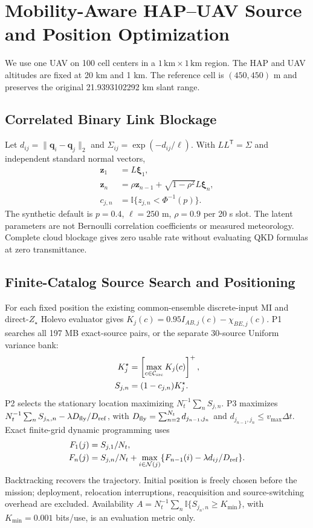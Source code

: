 \section{Mobility-Aware HAP--UAV Source and Position Optimization}
We use one UAV on 100 cell centers in a $1\,\mathrm{km}\times1\,\mathrm{km}$ region.
The HAP and UAV altitudes are fixed at 20 km and 1 km. The reference cell is
$(450,450)$ m and preserves the original 21.9393102292 km slant range.
\subsection{Correlated Binary Link Blockage}
Let $d_{ij}=\|\mathbf q_i-\mathbf q_j\|_2$ and $\Sigma_{ij}=\exp(-d_{ij}/\ell)$.
With $LL^{\mathsf T}=\Sigma$ and independent standard normal vectors,
\begin{align}
\mathbf z_1&=L\boldsymbol\xi_1,\\
\mathbf z_n&=\rho\mathbf z_{n-1}+\sqrt{1-\rho^2}L\boldsymbol\xi_n,\\
c_{j,n}&=\mathbb{I}\{z_{j,n}<\Phi^{-1}(p)\}.
\end{align}
The synthetic default is $p=0.4$, $\ell=250$ m, $\rho=0.9$ per 20 s slot.
The latent parameters are not Bernoulli correlation coefficients or measured meteorology.
Complete cloud blockage gives zero usable rate without evaluating QKD formulas at zero transmittance.
\subsection{Finite-Catalog Source Search and Positioning}
For each fixed position the existing common-ensemble discrete-input MI and direct-$Z_\star$
Holevo evaluator gives $K_j(c)=0.95 I_{AB,j}(c)-\chi_{BE,j}(c)$.
P1 searches all 197 MB exact-source pairs, or the separate 30-source Uniform variance bank:
\begin{align}
K_j^\star&=\left[\max_{c\in\mathcal C_{\rm src}} K_j(c)\right]^+,\\
S_{j,n}&=(1-c_{j,n})K_j^\star.
\end{align}
P2 selects the stationary location maximizing $N_t^{-1}\sum_n S_{j,n}$.
P3 maximizes $N_t^{-1}\sum_n S_{j_n,n}-\lambda D_{\rm fly}/D_{\rm ref}$,
with $D_{\rm fly}=\sum_{n=2}^{N_t}d_{j_{n-1},j_n}$ and
$d_{j_{n-1},j_n}\le v_{\max}\Delta t$. Exact finite-grid dynamic programming uses
\begin{align}
F_1(j)&=S_{j,1}/N_t,\\
F_n(j)&=S_{j,n}/N_t+\max_{i\in\mathcal N(j)}\{F_{n-1}(i)-\lambda d_{ij}/D_{\rm ref}\}.
\end{align}
Backtracking recovers the trajectory. Initial position is freely chosen before the mission;
deployment, relocation interruptions, reacquisition and source-switching overhead are excluded.
Availability $A=N_t^{-1}\sum_n\mathbb{I}\{S_{j_n,n}\ge K_{\min}\}$,
with $K_{\min}=0.001$ bits/use, is an evaluation metric only.
